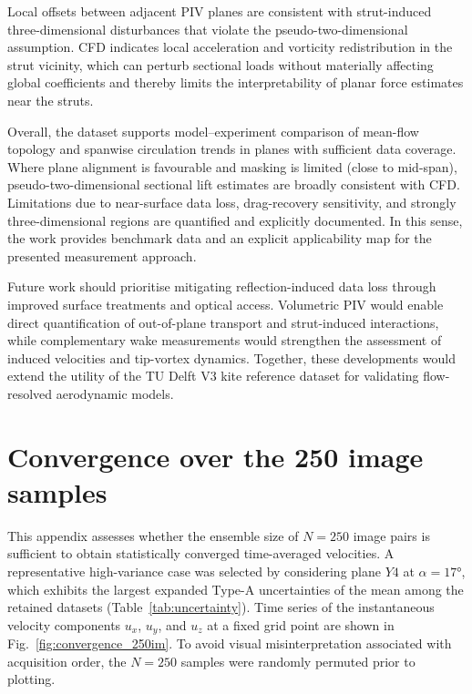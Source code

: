\documentclass[wes, manuscript]{copernicus}
\begin{document}
Local offsets between adjacent PIV planes are consistent with strut-induced three-dimensional disturbances that violate the pseudo-two-dimensional assumption. CFD indicates local acceleration and vorticity redistribution in the strut vicinity, which can perturb sectional loads without materially affecting global coefficients and thereby limits the interpretability of planar force estimates near the struts.

Overall, the dataset supports model–experiment comparison of mean-flow topology and spanwise circulation trends in planes with sufficient data coverage. Where plane alignment is favourable and masking is limited (close to mid-span), pseudo-two-dimensional sectional lift estimates are broadly consistent with CFD. Limitations due to near-surface data loss, drag-recovery sensitivity, and strongly three-dimensional regions are quantified and explicitly documented. In this sense, the work provides benchmark data and an explicit applicability map for the presented measurement approach.

Future work should prioritise mitigating reflection-induced data loss through improved surface treatments and optical access. Volumetric PIV would enable direct quantification of out-of-plane transport and strut-induced interactions, while complementary wake measurements would strengthen the assessment of induced velocities and tip-vortex dynamics. Together, these developments would extend the utility of the TU Delft V3 kite reference dataset for validating flow-resolved aerodynamic models.
%
\appendix
%
\section{Convergence over the 250 image samples}\label{sec:appendix_convergence}
%
\appendixfigures
\appendixtables
%
This appendix assesses whether the ensemble size of $N=250$ image pairs is sufficient to obtain statistically converged time-averaged velocities.
A representative high-variance case was selected by considering plane $Y4$ at $\alpha=17\unit{\degree}$, which exhibits the largest expanded Type-A uncertainties of the mean among the retained datasets (Table~\ref{tab:uncertainty}).
Time series of the instantaneous velocity components $u_{x}$, $u_{y}$, and $u_{z}$ at a fixed grid point are shown in Fig.~\ref{fig:convergence_250im}.
To avoid visual misinterpretation associated with acquisition order, the $N=250$ samples were randomly permuted prior to plotting.
\end{document}
